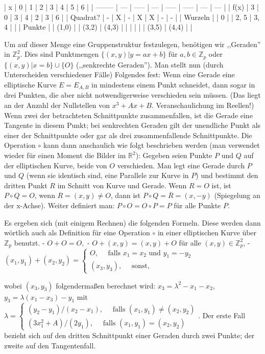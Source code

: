 \documentclass[a4paper]{article}
\begin{document}
\begin{multicols}{3}
{{{{| x        | 0   | 1     | 2   | 3     | 4     | 5   | 6   |
| -------- | --- | ----- | --- | ----- | ----- | --- | --- |
| f(x)     | 3   | 0     | 3   | 4     | 2     | 3   | 6   |
| Quadrat? | -   | X     | -   | X     | X     | -   | -   |
| Wurzeln  |     | 0     |     | 2, 5  | 3, 4  |     |
| Punkte   |     | (1,0) |     | (3,2) | (4,3) |
|          |     |       |     | (3,5) | (4,4) |     |

Um auf dieser Menge eine Gruppenstruktur festzulegen, benötigen wir ,,Geraden'' in $\mathbb{Z}^2_p$. Dies sind Punktmengen $\{(x,y)|y=ax+b\}$ für $a,b\in\mathbb{Z}_p$ oder $\{(x,y)|x=b\}\cup\{O\}$ (,,senkrechte Geraden''). Man stellt nun (durch Unterscheiden verschiedener Fälle) Folgendes fest: Wenn eine Gerade eine elliptische Kurve $E=E_{A,B}$ in mindestens einem Punkt schneidet, dann sogar in drei Punkten, die aber nicht notwendigerweise verschieden sein müssen. (Das liegt an der Anzahl der Nullstellen von $x^3+Ax+B$. Veranschaulichung im Reellen!)
Wenn zwei der betrachteten Schnittpunkte zusammenfallen, ist die Gerade eine Tangente in diesem Punkt; bei senkrechten Geraden gilt der unendliche Punkt als einer der Schnittpunkte oder gar als drei zusammenfallende Schnittpunkte.
Die Operation $\circ$ kann dann anschaulich wie folgt beschrieben werden (man verwendet wieder für einen Moment die Bilder im $\mathbb{R}^2$): Gegeben seien Punkte $P$ und $Q$ auf der elliptischen Kurve, beide von $O$ verschieden. Man legt eine Gerade durch $P$ und $Q$ (wenn sie identisch sind, eine Parallele zur Kurve in $P$) und bestimmt den dritten Punkt $R$ im Schnitt von Kurve und Gerade. Wenn $R=O$ ist, ist $P\circ Q=O$, wenn $R= (x,y)\not=O$, dann ist $P\circ Q=\overline{R}= (x,-y)$ (Spiegelung an der x-Achse).
Weiter definiert man: $P\circ O=O\circ P=P$ für alle Punkte $P$.

Es ergeben sich (mit einigem Rechnen) die folgenden Formeln. Diese werden dann wörtlich auch als Definition für eine Operation $\circ$ in einer elliptischen Kurve über $\mathbb{Z}_p$ benutzt.
- $O+O=O,$
- $O+ (x,y) = (x,y) +O$ für alle $(x,y)\in\mathbb{Z}^2_p$,
- $(x_1,y_1) + (x_2,y_2) =\begin{cases} O,\quad\text{ falls } x_1=x_2 \text{ und } y_1=-y_2 \\ (x_3,y_3),\quad\text{ sonst,}\end{cases}$

wobei $(x_3,y_3)$ folgendermaßen berechnet wird: $x_3=\lambda^2-x_1-x_2$, $y_3=\lambda(x_1-x_3)-y_1$ mit $\lambda=\begin{cases} (y_2-y_1)/(x_2-x_1),\quad\text{ falls } (x_1,y_1)\not= (x_2,y_2)\\ (3x^2_1+A)/(2y_1),\quad\text{ falls } (x_1,y_1) = (x_2,y_2)\end{cases}$.
Der erste Fall bezieht sich auf den dritten Schnittpunkt einer Geraden durch zwei Punkte; der zweite auf den Tangentenfall.

}}}}
\end{multicols}
\end{document}
